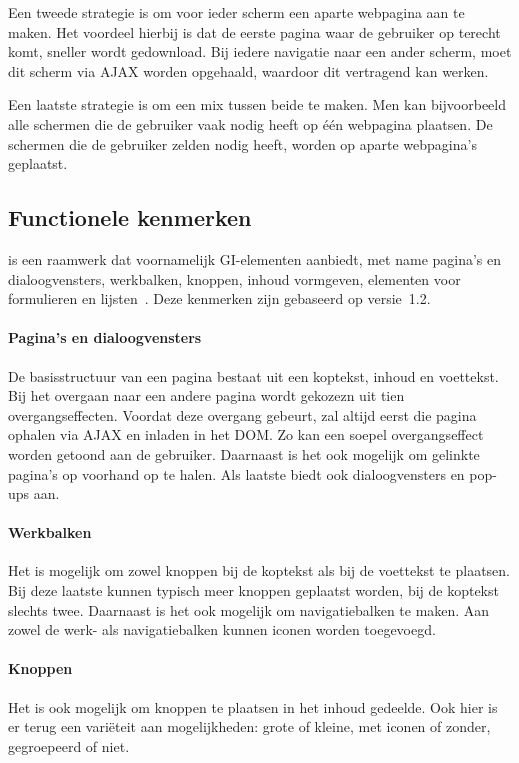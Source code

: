 Een tweede strategie is om voor ieder scherm een aparte webpagina aan te maken. 
Het voordeel hierbij is dat de eerste pagina waar de gebruiker op terecht komt, sneller wordt gedownload. 
Bij iedere navigatie naar een ander scherm, moet dit scherm via AJAX worden opgehaald, waardoor dit vertragend kan werken. 

Een laatste strategie is om een mix tussen beide te maken. 
Men kan bijvoorbeeld alle schermen die de gebruiker vaak nodig heeft op één webpagina plaatsen. 
De schermen die de gebruiker zelden nodig heeft, worden op aparte webpagina's geplaatst.   

\subsection{Functionele kenmerken}
\jqm{} is een raamwerk dat voornamelijk GI-elementen aanbiedt, met name pagina's en dialoogvensters, werkbalken, knoppen, inhoud vormgeven, elementen voor formulieren en lijsten~\cite{JQuery2012b}.
Deze kenmerken zijn gebaseerd op versie~1.2.

\paragraph{Pagina's en dialoogvensters}
De basisstructuur van een pagina bestaat uit een koptekst, inhoud en voettekst. 
Bij het overgaan naar een andere pagina wordt gekozezn uit tien overgangseffecten. 
Voordat deze overgang gebeurt, zal \jqm{} altijd eerst die pagina ophalen via AJAX en inladen in het DOM. 
Zo kan een soepel overgangseffect worden getoond aan de gebruiker. 
Daarnaast is het ook mogelijk om gelinkte pagina's op voorhand op te halen. 
Als laatste biedt \jqm{} ook dialoogvensters en pop-ups aan. 

\paragraph{Werkbalken}
Het is mogelijk om zowel knoppen bij de koptekst als bij de voettekst te plaatsen. 
Bij deze laatste kunnen typisch meer knoppen geplaatst worden, bij de koptekst slechts twee. 
Daarnaast is het ook mogelijk om navigatiebalken te maken. 
Aan zowel de werk- als navigatiebalken kunnen iconen worden toegevoegd.

\paragraph{Knoppen}
Het is ook mogelijk om knoppen te plaatsen in het inhoud gedeelde. 
Ook hier is er terug een variëteit aan mogelijkheden: grote of kleine, met iconen of zonder, gegroepeerd of niet. 

